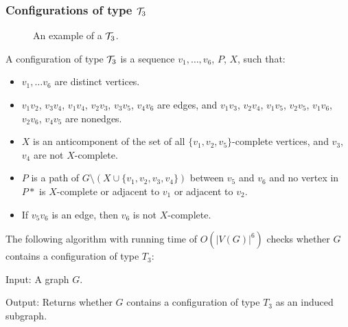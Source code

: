 \subsubsection{Configurations of type $\mathcal{T}_3$}

\begin{wrapfigure}{r}{0.35\textwidth}
	
	\caption{An example of a $\mathcal{T}_3$.}%
	\vspace{-1.5cm}
\end{wrapfigure}

A configuration of type $\mathcal{T}_3$ is a sequence $v_1, \ldots, v_6$, $P$, $X$, such that:
\begin{itemize}
	\item $v_1, \ldots v_6$ are distinct vertices.
	\item $v_1v_2$, $v_3v_4$, $v_1v_4$, $v_2v_3$, $v_3v_5$, $v_4v_6$ are edges, and $v_1v_3$, $v_2v_4$, $v_1v_5$, $v_2v_5$, $v_1v_6$, $v_2v_6$, $v_4v_5$ are nonedges.
	\item $X$ is an anticomponent of the set of all $\{v_1, v_2, v_5\}$-complete vertices, and $v_3$, $v_4$ are not $X$-complete.
	\item $P$ is a path of $G \setminus ( X \cup \{v_1, v_2, v_3, v_4\} )$ between $v_5$ and $v_6$ and no vertex in $P*$ is $X$-complete or adjacent to $v_1$ or adjacent to $v_2$.
	\item If $v_5v_6$ is an edge, then $v_6$ is not $X$-complete.
\end{itemize}

The following algorithm with running time of $O(|V(G)|^6)$ checks whether $G$ contains a configuration of type $T_3$:

\begin{alg}
	\label{alg:t3}
	Input: A graph $G$.

	\noindent Output: Returns whether $G$ contains a configuration of type $T_3$ as an induced subgraph.
\end{alg}


